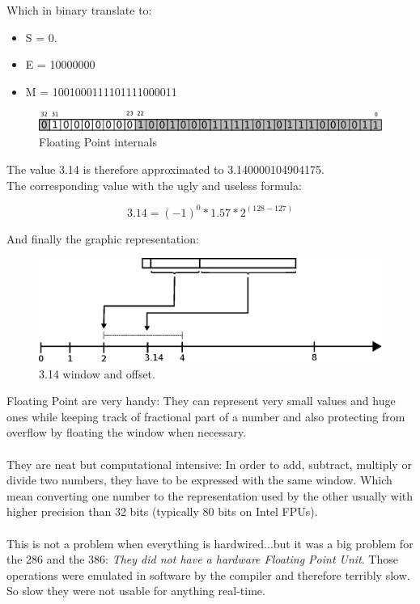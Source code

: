 \documentclass[book.tex]{subfiles}
\begin{document}
Which in binary translate to:

\begin{itemize}
\item S = 0.
\item E = 10000000
\item M = 1001000111101111000011
\end{itemize}

\begin{figure}[H]
\centering
\includegraphics[scale=0.4]{imgs/floating_point_layout_pi.eps}
\caption{Floating Point internals}
\label{fig:fp_internals}
\end{figure}
  \bigskip

The value 3.14 is therefore approximated to 3.140000104904175.\\

The corresponding value with the ugly and useless formula:

\begin{equation}
3.14 = (-1)^0 * 1.57 * 2^{(128-127)}
\end{equation}

\bigskip

And finally the graphic representation:\\

\begin{figure}[H]
\centering
\includegraphics[scale=0.7]{imgs/floating_point_window_pi.eps}

\caption{3.14 window and offset.}
\label{fig:fp_internals}
\end{figure}
  \bigskip

Floating Point are very handy: They can represent very small values and huge ones while keeping track of fractional part of a number and also protecting from overflow by floating the window when necessary.\\
\\
They are neat but computational intensive: In order to add, subtract, multiply or divide two numbers, they have to be expressed with the same window. Which mean converting one number to the representation used by the other usually with higher precision than 32 bits (typically 80 bits on Intel FPUs).\\
\\
This is not a problem when everything is hardwired...but it was a big problem for the 286 and the 386: \emph{They did not have a hardware Floating Point Unit}. Those operations were emulated in software by the compiler and therefore terribly slow. So slow they were not usable for anything real-time. 
\end{document}
